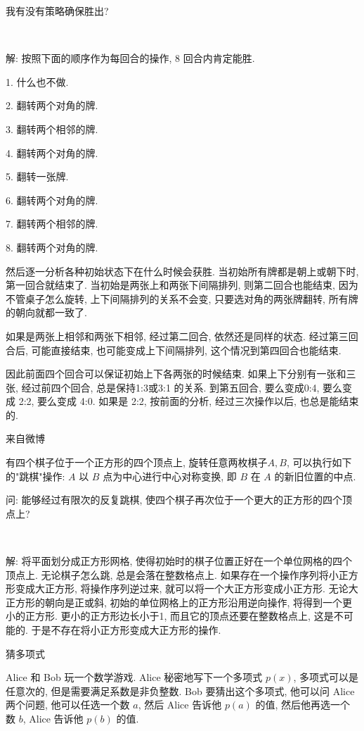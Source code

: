 我有没有策略确保胜出?

~

解: 按照下面的顺序作为每回合的操作, 8 回合内肯定能胜. 

1. 什么也不做.

2. 翻转两个对角的牌.

3. 翻转两个相邻的牌.

4. 翻转两个对角的牌.

5. 翻转一张牌.

6. 翻转两个对角的牌.

7. 翻转两个相邻的牌.

8. 翻转两个对角的牌.

然后逐一分析各种初始状态下在什么时候会获胜. 当初始所有牌都是朝上或朝下时, 第一回合就结束了. 当初始是两张上和两张下间隔排列, 则第二回合也能结束, 因为不管桌子怎么旋转, 上下间隔排列的关系不会变, 只要选对角的两张牌翻转, 所有牌的朝向就都一致了. 

如果是两张上相邻和两张下相邻, 经过第二回合, 依然还是同样的状态. 经过第三回合后, 可能直接结束, 也可能变成上下间隔排列, 这个情况到第四回合也能结束. 

因此前面四个回合可以保证初始上下各两张的时候结束. 如果上下分别有一张和三张, 经过前四个回合, 总是保持1:3或3:1 的关系. 到第五回合, 要么变成0:4, 要么变成 2:2, 要么变成 4:0. 如果是 2:2, 按前面的分析, 经过三次操作以后, 也总是能结束的.

\newpage
\noindent 来自微博

有四个棋子位于一个正方形的四个顶点上, 旋转任意两枚棋子$A,B$, 可以执行如下的"跳棋"操作: $A$ 以 $B$ 点为中心进行中心对称变换, 即 $B$ 在 $A$ 的新旧位置的中点.

问: 能够经过有限次的反复跳棋, 使四个棋子再次位于一个更大的正方形的四个顶点上?

~

解: 将平面划分成正方形网格, 使得初始时的棋子位置正好在一个单位网格的四个顶点上. 无论棋子怎么跳, 总是会落在整数格点上. 如果存在一个操作序列将小正方形变成大正方形, 将操作序列逆过来, 就可以将一个大正方形变成小正方形. 无论大正方形的朝向是正或斜, 初始的单位网格上的正方形沿用逆向操作, 将得到一个更小的正方形. 更小的正方形边长小于1, 而且它的顶点还要在整数格点上, 这是不可能的. 于是不存在将小正方形变成大正方形的操作.


\newpage

\noindent 猜多项式

Alice 和 Bob 玩一个数学游戏. Alice 秘密地写下一个多项式 $p(x)$, 多项式可以是任意次的, 但是需要满足系数是非负整数. Bob 要猜出这个多项式, 他可以问 Alice 两个问题, 他可以任选一个数 $a$, 然后 Alice 告诉他 $p(a)$ 的值, 然后他再选一个数 $b$, Alice 告诉他 $p(b)$ 的值. 

